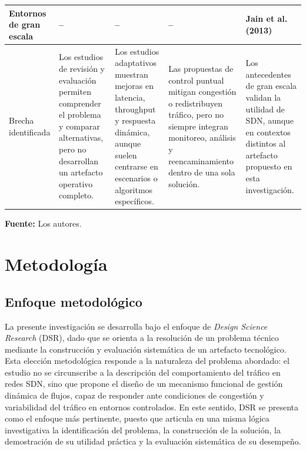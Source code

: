 \documentclass[12pt,a4paper]{article}
\begin{document}
\begin{table}[H]
\begin{tabular}{|p{2.5cm}|p{2.7cm}|p{2.7cm}|p{2.7cm}|p{2.5cm}|}
Entornos de gran escala &
-- &
-- &
-- &
Jain et al. (2013) \\
\hline

Brecha identificada &
Los estudios de revisión y evaluación permiten comprender el problema y comparar alternativas, pero no desarrollan un artefacto operativo completo. &
Los estudios adaptativos muestran mejoras en latencia, throughput y respuesta dinámica, aunque suelen centrarse en escenarios o algoritmos específicos. &
Las propuestas de control puntual mitigan congestión o redistribuyen tráfico, pero no siempre integran monitoreo, análisis y reencaminamiento dentro de una sola solución. &
Los antecedentes de gran escala validan la utilidad de SDN, aunque en contextos distintos al artefacto propuesto en esta investigación. \\
\hline

\end{tabular}

\vspace{0.15cm}
\noindent\textbf{Fuente:} Los autores.
\end{table}
\section{Metodología}
\subsection{Enfoque metodológico}
La presente investigación se desarrolla bajo el enfoque de \textit{Design Science Research} (DSR), dado que se orienta a la resolución de un problema técnico mediante la construcción y evaluación sistemática de un artefacto tecnológico. Esta elección metodológica responde a la naturaleza del problema abordado: el estudio no se circunscribe a la descripción del comportamiento del tráfico en redes SDN, sino que propone el diseño de un mecanismo funcional de gestión dinámica de flujos, capaz de responder ante condiciones de congestión y variabilidad del tráfico en entornos controlados. En este sentido, DSR se presenta como el enfoque más pertinente, puesto que articula en una misma lógica investigativa la identificación del problema, la construcción de la solución, la demostración de su utilidad práctica y la evaluación sistemática de su desempeño.
\end{document}
